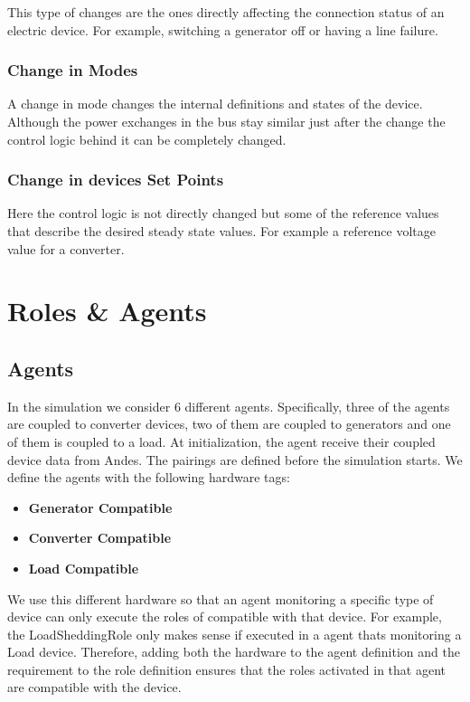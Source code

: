 \documentclass{article}
\begin{document}
This type of changes are the ones directly affecting the connection status of an electric device. For example, switching a generator off or having a line failure.

\subsubsection*{Change in Modes}
A change in mode changes the internal definitions and states of the device. Although the power exchanges in the bus stay similar just after the change the control logic behind it can be completely changed.

\subsubsection*{Change in devices Set Points}

Here the control logic is not directly changed but some of the reference values that describe the desired steady state values. For example a reference voltage value for a converter.

\section{Roles \& Agents}


\subsection{Agents}
In the simulation we consider 6 different agents. Specifically, three of the agents are coupled to converter devices, two of them are coupled to generators and one of them is coupled to a load. At initialization, the agent receive their coupled device data from Andes. The pairings are defined before the simulation starts. We define the agents with the following hardware tags:

\begin{itemize}
    \item \textbf{Generator Compatible}
    \item \textbf{Converter Compatible}
    \item \textbf{Load Compatible}
\end{itemize}

We use this different hardware so that an agent monitoring a specific type of device can only execute the roles of compatible with that device. For example, the LoadSheddingRole only makes sense if executed in a agent thats monitoring a Load device. Therefore, adding both the hardware to the agent definition and the requirement to the role definition ensures that the roles activated in that agent are compatible with the device.
\end{document}
